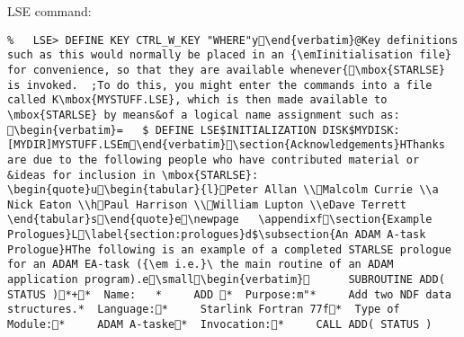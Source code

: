 {\mbox{LSE} command:    \begin{verbatim}%    LSE> DEFINE KEY CTRL_W_KEY "WHERE"y \end{verbatim}  @ Key definitions such as this would normally be placed in an {\emI initialisation file} for convenience, so that they are available whenever{ \mbox{STARLSE} is invoked.  ; To do this, you might enter the commands into a file called K \mbox{MYSTUFF.LSE}, which is then made available to \mbox{STARLSE} by means & of a logical name assignment such as:    \begin{verbatim}=    $ DEFINE LSE$INITIALIZATION DISK$MYDISK:[MYDIR]MYSTUFF.LSEm \end{verbatim}     \section{Acknowledgements}  H Thanks are due to the following people who have contributed material or & ideas for inclusion in \mbox{STARLSE}:  
 \begin{quote}u \begin{tabular}{l} Peter Allan \\ Malcolm Currie \\a
 Nick Eaton \\h Paul Harrison \\ William Lupton \\e Dave Terrett
 \end{tabular}s \end{quote}e   \newpage	 \appendixf   \section{Example Prologues}L \label{section:prologues}d  $ \subsection{An ADAM A-task Prologue}  H The following is an example of a completed STARLSE prologue for an ADAM E A-task ({\em i.e.}\ the main routine of an ADAM application program).e   \small \begin{verbatim}       SUBROUTINE ADD( STATUS ) *+ *  Name:	 *     ADD    *  Purpose:m" *     Add two NDF data structures.   *  Language: *     Starlink Fortran 77f   *  Type of Module: *     ADAM A-taske   *  Invocation: *     CALL ADD( STATUS )  

\end{verbatim}}
